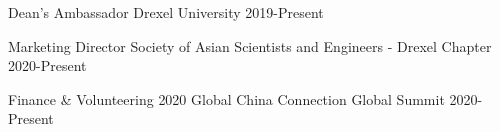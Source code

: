 

\begin{cvhonors}

  \cvhonor
  {Dean's Ambassador} %
  {Drexel University} %
  {2019-Present} %

  \cvhonor
  {Marketing Director} %
  {Society of Asian Scientists and Engineers - Drexel Chapter} %
  {2020-Present} %

  \cvhonor
  {Finance \& Volunteering} %
  {2020 Global China Connection Global Summit} %
  {2020-Present} %

\end{cvhonors}

